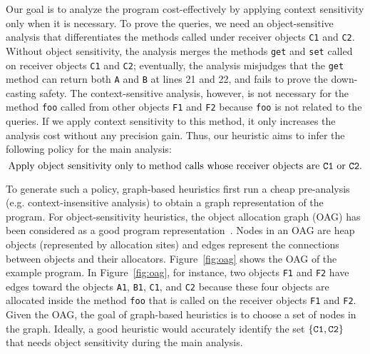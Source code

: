 Our goal is to analyze the program cost-effectively by applying context sensitivity only when it is necessary.
To prove the queries, we need an object-sensitive analysis that differentiates the methods called under receiver objects {\tt C1} and {\tt C2}.
Without object sensitivity, the analysis merges the methods {\tt get} and {\tt set} called on receiver objects {\tt C1} and {\tt C2};
eventually, the analysis misjudges that the {\tt get} method can return both {\tt A} and {\tt B} at lines 21 and 22, and fails to prove the down-casting safety.
The context-sensitive analysis, however, is not necessary for the method {\tt foo} called from other objects {\tt F1} and {\tt F2}
because {\tt foo} is not related to the queries.
If we apply context sensitivity to this method, it only increases the analysis cost without any precision gain.
Thus, our heuristic aims to infer the following policy for the main analysis:
\[
\mbox{Apply object sensitivity only to method calls whose receiver objects are {\tt C1} or {\tt C2}.}
\]



To generate such a policy, graph-based heuristics first run a cheap pre-analysis (e.g. context-insensitive analysis) to
obtain a graph representation of the program.
For object-sensitivity heuristics, the object allocation graph (OAG) has been considered as a good program
representation~\cite{Li2018b,TanLX16}.
%
Nodes in an OAG are heap objects (represented by allocation sites) and edges represent the connections between objects and their allocators. Figure~\ref{fig:oag} shows the OAG of the example program.
In Figure~\ref{fig:oag}, for instance, two objects {\tt F1} and {\tt F2} have edges toward the objects {\tt A1}, {\tt B1}, {\tt C1}, and
{\tt C2} because these four objects are allocated inside the method {\tt foo} that is called on the receiver objects {\tt F1} and {\tt F2}.
Given the OAG, the goal of graph-based heuristics is to choose a set of nodes in the graph.
Ideally, a good heuristic would accurately identify the set $\{ {\tt C1}, {\tt C2} \}$ that needs object sensitivity during the main analysis.


